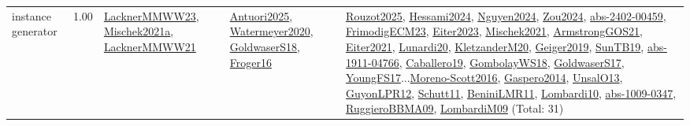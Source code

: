 {\begin{longtable}{p{3cm}r>{\raggedright\arraybackslash}p{6cm}>{\raggedright\arraybackslash}p{6cm}>{\raggedright\arraybackslash}p{8cm}}
\index{instance generator}\index{Benchmarks!instance generator}instance generator &  1.00 & \hyperref[detail:LacknerMMWW23]{LacknerMMWW23}, \hyperref[detail:Mischek2021a]{Mischek2021a}, \hyperref[detail:LacknerMMWW21]{LacknerMMWW21} & \hyperref[detail:Antuori2025]{Antuori2025}, \hyperref[detail:Watermeyer2020]{Watermeyer2020}, \hyperref[detail:GoldwaserS18]{GoldwaserS18}, \hyperref[detail:Froger16]{Froger16} & \hyperref[detail:Rouzot2025]{Rouzot2025}, \hyperref[detail:Hessami2024]{Hessami2024}, \hyperref[detail:Nguyen2024]{Nguyen2024}, \hyperref[detail:Zou2024]{Zou2024}, \hyperref[detail:abs-2402-00459]{abs-2402-00459}, \hyperref[detail:FrimodigECM23]{FrimodigECM23}, \hyperref[detail:Eiter2023]{Eiter2023}, \hyperref[detail:Mischek2021]{Mischek2021}, \hyperref[detail:ArmstrongGOS21]{ArmstrongGOS21}, \hyperref[detail:Eiter2021]{Eiter2021}, \hyperref[detail:Lunardi20]{Lunardi20}, \hyperref[detail:KletzanderM20]{KletzanderM20}, \hyperref[detail:Geiger2019]{Geiger2019}, \hyperref[detail:SunTB19]{SunTB19}, \hyperref[detail:abs-1911-04766]{abs-1911-04766}, \hyperref[detail:Caballero19]{Caballero19}, \hyperref[detail:GombolayWS18]{GombolayWS18}, \hyperref[detail:GoldwaserS17]{GoldwaserS17}, \hyperref[detail:YoungFS17]{YoungFS17}...\hyperref[detail:Moreno-Scott2016]{Moreno-Scott2016}, \hyperref[detail:Gaspero2014]{Gaspero2014}, \hyperref[detail:UnsalO13]{UnsalO13}, \hyperref[detail:GuyonLPR12]{GuyonLPR12}, \hyperref[detail:Schutt11]{Schutt11}, \hyperref[detail:BeniniLMR11]{BeniniLMR11}, \hyperref[detail:Lombardi10]{Lombardi10}, \hyperref[detail:abs-1009-0347]{abs-1009-0347}, \hyperref[detail:RuggieroBBMA09]{RuggieroBBMA09}, \hyperref[detail:LombardiM09]{LombardiM09} (Total: 31)\\

\end{longtable}}
